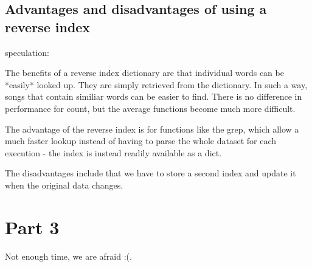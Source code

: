 \documentclass{article}
\begin{document}
\subsection{Advantages and disadvantages of using a reverse index}

speculation:


The benefits of a reverse index dictionary are that individual words can be *easily* looked up. They are simply retrieved from the dictionary. In such a way, songs that contain similiar words can be easier to find. There is no difference in performance for count, but the average functions become much more difficult.

The advantage of the reverse index is for functions like the grep, which allow a much faster lookup instead of having to parse the whole dataset for each execution - the index is instead readily available as a dict.

The disadvantages include that we have to store a second index and update it when the original data changes. 
\section{Part 3}
Not enough time, we are afraid :(.
\end{document}
